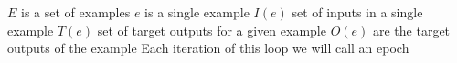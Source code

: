 \documentclass[11pt]{article}
\begin{document}
$E$ is a set of examples
$e$ is a single example
$I(e)$ set of inputs in a single example
$T(e)$ set of target outputs for a given example
$O(e)$ are the target outputs of the example
Each iteration of this loop we will call an epoch


% 
\end{document}
